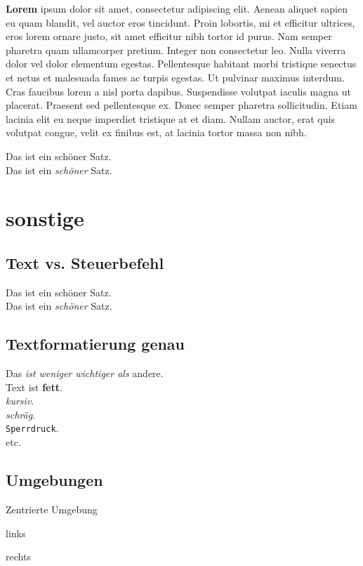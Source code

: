 \documentclass[a4paper, ngerman, oneside, 10pt]{article}
\begin{document}
\textbf{Lorem} ipsum dolor sit amet, consectetur adipiscing elit. Aenean aliquet sapien eu quam blandit, vel auctor eros tincidunt. Proin lobortis, mi et efficitur ultrices, eros lorem ornare justo, sit amet efficitur nibh tortor id purus. Nam semper pharetra quam ullamcorper pretium. Integer non consectetur leo. Nulla viverra dolor vel dolor elementum egestas. Pellentesque habitant morbi tristique senectus et netus et malesuada fames ac turpis egestas. Ut pulvinar maximus interdum. Cras faucibus lorem a nisl porta dapibus. Suspendisse volutpat iaculis magna ut placerat. Praesent sed pellentesque ex. Donec semper pharetra sollicitudin. Etiam lacinia elit eu neque imperdiet tristique at et diam. Nullam auctor, erat quis volutpat congue, velit ex finibus est, at lacinia tortor massa non nibh.

Das ist ein schöner Satz.\\ Das ist ein \emph{schöner} Satz.

\section{sonstige}

\subsection{Text vs. Steuerbefehl}
Das ist ein schöner Satz.\\ Das ist ein \emph{schöner} Satz.

\subsection{Textformatierung genau}
Das \emph{ist \emph{weniger wichtiger} als} andere.\\
Text ist \textbf{fett}.\\
\textit{kursiv}.\\
\textsl{schräg}.\\
\texttt{Sperrdruck}.\\
etc.

\subsection{Umgebungen}
\begin{center}
	Zentrierte Umgebung
\end{center}
\begin{flushleft}
	links
\end{flushleft}
\begin{flushright}
	rechts
\end{flushright}
\end{document}
